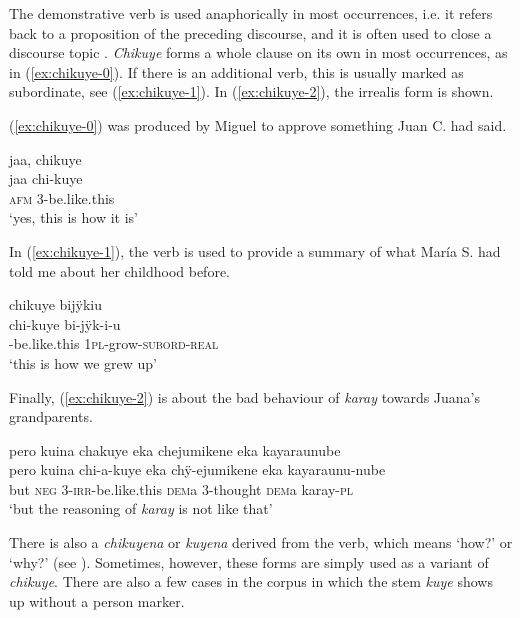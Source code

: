 The demonstrative verb is used anaphorically in most occurrences, i.e. it refers back to a proposition of the preceding discourse, and it is often used to close a discourse topic \citep[cf.][173]{Guerin2015}. \textit{Chikuye} forms a whole clause on its own in most occurrences, as in (\ref{ex:chikuye-0}). If there is an additional verb, this is usually marked as subordinate, see (\ref{ex:chikuye-1}). In (\ref{ex:chikuye-2}), the irrealis form is shown.

(\ref{ex:chikuye-0}) was produced by Miguel to approve something Juan C. had said.

\ea\label{ex:chikuye-0}
\begingl
\glpreamble jaa, chikuye\\
\gla jaa chi-kuye\\
\glb \textsc{afm} 3-be.like.this\\
\glft ‘yes, this is how it is’
\endgl
\trailingcitation{[mqx-p110826l.277]}
\xe

In (\ref{ex:chikuye-1}), the verb is used to provide a summary of what María S. had told me about her childhood before.

\ea\label{ex:chikuye-1}
\begingl
\glpreamble chikuye bijÿkiu\\
\gla chi-kuye bi-jÿk-i-u\\
-be.like.this 1\textsc{pl}-grow-\textsc{subord}-\textsc{real}\\
\glft ‘this is how we grew up’
\endgl
\trailingcitation{[rxx-p181101l-2.215]}
\xe


Finally, (\ref{ex:chikuye-2}) is about the bad behaviour of \textit{karay} towards Juana’s grandparents.

\ea\label{ex:chikuye-2}
\begingl
\glpreamble pero kuina chakuye eka chejumikene eka kayaraunube\\
\gla pero kuina chi-a-kuye eka chÿ-ejumikene eka kayaraunu-nube\\
\glb but \textsc{neg} 3-\textsc{irr}-be.like.this \textsc{dem}a 3-thought \textsc{dem}a karay-\textsc{pl}\\
\glft ‘but the reasoning of \textit{karay} is not like that’
\endgl
\trailingcitation{[jxx-e150925l-1.256]}%
\xe
{}

There is also a  \textit{chikuyena} or \textit{kuyena} derived from the verb, which means ‘how?’ or ‘why?’ (see ). Sometimes, however, these forms are simply used as a variant of \textit{chikuye}. There are also a few cases in the corpus in which the stem \textit{kuye} shows up without a person marker. 


